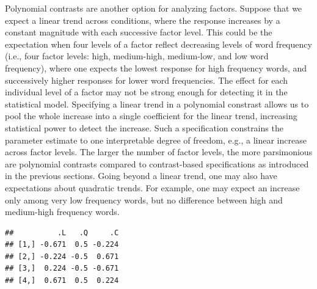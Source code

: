\documentclass[12pt,]{krantz}
\newenvironment{Shaded}{\begin{snugshade}}{\end{snugshade}}
\newcommand{\KeywordTok}[1]{\textcolor[rgb]{0.13,0.29,0.53}{\textbf{#1}}}
\newcommand{\DecValTok}[1]{\textcolor[rgb]{0.00,0.00,0.81}{#1}}
\newcommand{\StringTok}[1]{\textcolor[rgb]{0.31,0.60,0.02}{#1}}
\newcommand{\OperatorTok}[1]{\textcolor[rgb]{0.81,0.36,0.00}{\textbf{#1}}}
\newcommand{\NormalTok}[1]{#1}
\theoremstyle{definition}
\theoremstyle{definition}
\theoremstyle{definition}
\theoremstyle{remark}
\begin{document}
Polynomial contrasts are another option for analyzing factors. Suppose
that we expect a linear trend across conditions, where the response
increases by a constant magnitude with each successive factor level.
This could be the expectation when four levels of a factor reflect
decreasing levels of word frequency (i.e., four factor levels: high,
medium-high, medium-low, and low word frequency), where one expects the
lowest response for high frequency words, and successively higher
responses for lower word frequencies. The effect for each individual
level of a factor may not be strong enough for detecting it in the
statistical model. Specifying a linear trend in a polynomial constrast
allows us to pool the whole increase into a single coefficient for the
linear trend, increasing statistical power to detect the increase. Such
a specification constrains the parameter estimate to one interpretable
degree of freedom, e.g., a linear increase across factor levels. The
larger the number of factor levels, the more parsimonious are polynomial
contrasts compared to contrast-based specifications as introduced in the
previous sections. Going beyond a linear trend, one may also have
expectations about quadratic trends. For example, one may expect an
increase only among very low frequency words, but no difference between
high and medium-high frequency words.

\begin{Shaded}
\end{Shaded}

\begin{verbatim}
##          .L   .Q     .C
## [1,] -0.671  0.5 -0.224
## [2,] -0.224 -0.5  0.671
## [3,]  0.224 -0.5 -0.671
## [4,]  0.671  0.5  0.224
\end{verbatim}
\end{document}
